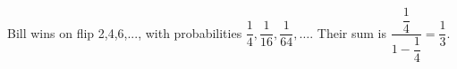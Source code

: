 Bill wins on flip 2,4,6,..., with probabilities $\dfrac{1}{4},\dfrac{1}{16},\dfrac{1}{64},\ldots$. Their sum is $\dfrac{\dfrac{1}{4}}{1-\dfrac{1}{4}}=\boxed{\dfrac{1}{3}}$.
